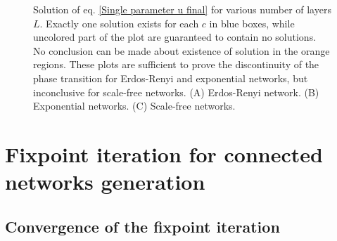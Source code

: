 \documentclass[
11pt, %
english, %
singlespacing, %
nolistspacing, %
liststotoc, %
headsepline, %
]{MastersDoctoralThesis} %
\begin{document}
{\begin{figure}
	\caption{Solution of eq. \eqref{Single parameter u final} for various number of layers $L$. Exactly one solution exists for each $c$ in blue boxes, while uncolored part of the plot are guaranteed to contain no solutions. No conclusion can be made about existence of solution in the orange regions. These plots are sufficient to prove the discontinuity of the phase transition for Erdos-Renyi and exponential networks, but inconclusive for scale-free networks. (A) Erdos-Renyi network. (B) Exponential networks. (C) Scale-free networks.}
	\label{Figure: Multilayer single parameter}
\end{figure}
}


\appendix  %

\chapter{Fixpoint iteration for connected networks generation}
\section{Convergence of the fixpoint iteration}
\label{Appendix: Fixpoint convergence}
\end{document}
